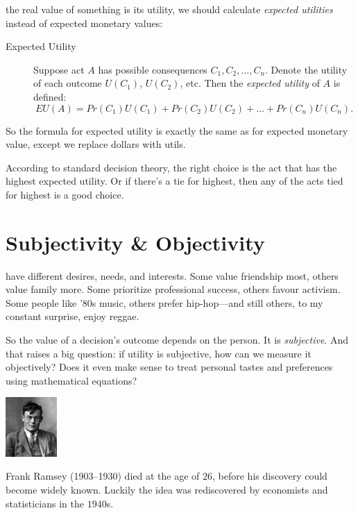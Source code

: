 \documentclass[justified]{tufte-book}
\renewcommand{\u}{U}
\newcommand{\p}{Pr}
\newcommand{\EU}{EU}
\theoremstyle{definition}
\theoremstyle{definition}
\theoremstyle{definition}
\theoremstyle{remark}
\begin{document}
 the real value of something is its utility, we should
calculate \emph{expected utilities} instead of expected monetary values:

\begin{description}
\item[Expected Utility]
Suppose act \(A\) has possible consequences \(C_1, C_2, \ldots,C_n\).
Denote the utility of each outcome \(U(C_1)\), \(U(C_2)\), etc. Then the
\emph{expected utility} of \(A\) is defined:
\[ \EU(A) = \p(C_1)\u(C_1) + \p(C_2)\u(C_2) + \ldots + \p(C_n)\u(C_n). \]
\end{description}

So the formula for expected utility is exactly the same as for expected
monetary value, except we replace dollars with utils.

According to standard decision theory, the right choice is the act that
has the highest expected utility. Or if there's a tie for highest, then
any of the acts tied for highest is a good choice.

\hypertarget{subjectivity-objectivity}{%
\section{Subjectivity \& Objectivity}\label{subjectivity-objectivity}}

 have different desires, needs, and interests. Some
value friendship most, others value family more. Some prioritize
professional success, others favour activism. Some people like '80s
music, others prefer hip-hop---and still others, to my constant
surprise, enjoy reggae.

So the value of a decision's outcome depends on the person. It is
\emph{subjective}. And that raises a big question: if utility is
subjective, how can we measure it objectively? Does it even make sense
to treat personal tastes and preferences using mathematical equations?

\begin{marginfigure}
\includegraphics[width=0.77in]{img/ramsey} \caption[Frank Ramsey (1903--1930) died at the age of $26$, before his discovery could become widely known]{Frank Ramsey (1903--1930) died at the age of $26$, before his discovery could become widely known. Luckily the idea was rediscovered by economists and statisticians in the $1940$s.}\label{fig:ramsey}
\end{marginfigure}
\end{document}
